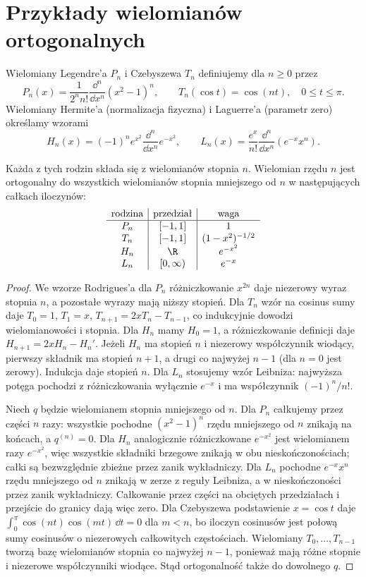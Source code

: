 \section{Przykłady wielomianów ortogonalnych}
\begin{definicja}
\label{ma1:def:orthogonal-polynomials-real}
Wielomiany Legendre'a $P_n$ i Czebyszewa $T_n$
definiujemy dla $n\ge0$ przez
\[
 P_n(x)=\frac1{2^n n!}\frac{\dd^n}{\dd x^n}(x^2-1)^n,
 \qquad T_n(\cos t)=\cos(nt),\quad 0\le t\le\pi.
\]
Wielomiany Hermite'a (normalizacja fizyczna)
i Laguerre'a (parametr zero) określamy wzorami
\[
 H_n(x)=(-1)^ne^{x^2}\frac{\dd^n}{\dd x^n}e^{-x^2},
 \qquad L_n(x)=\frac{e^x}{n!}\frac{\dd^n}{\dd x^n}(e^{-x}x^n).
\]
\end{definicja}
\begin{twierdzenie}
\label{ma1:thm:orthogonal-polynomials-real}
Każda z tych rodzin składa się z wielomianów
stopnia $n$. Wielomian rzędu $n$ jest ortogonalny
do wszystkich wielomianów stopnia mniejszego od $n$
w następujących całkach iloczynów:
\[
 \begin{array}{c|c|c}
 \text{rodzina}&\text{przedział}&\text{waga}\\ \hline
 P_n&[-1,1]&1\\
 T_n&[-1,1]&(1-x^2)^{-1/2}\\
 H_n&\R&e^{-x^2}\\
 L_n&[0,\infty)&e^{-x}
 \end{array}
\]
\end{twierdzenie}
\begin{proof}
We wzorze Rodrigues'a dla $P_n$ różniczkowanie
$x^{2n}$ daje niezerowy wyraz stopnia $n$,
a pozostałe wyrazy mają niższy stopień.
Dla $T_n$ wzór na cosinus sumy daje
$T_0=1$, $T_1=x$, $T_{n+1}=2xT_n-T_{n-1}$,
co indukcyjnie dowodzi wielomianowości i stopnia.
Dla $H_n$ mamy $H_0=1$, a różniczkowanie definicji
daje $H_{n+1}=2xH_n-H_n'$. Jeżeli $H_n$ ma stopień
$n$ i niezerowy współczynnik wiodący, pierwszy
składnik ma stopień $n+1$, a drugi co najwyżej
$n-1$ (dla $n=0$ jest zerowy). Indukcja daje stopień $n$.
Dla $L_n$ stosujemy wzór Leibniza: najwyższa
potęga pochodzi z różniczkowania wyłącznie
$e^{-x}$ i ma współczynnik $(-1)^n/n!$.

Niech $q$ będzie wielomianem stopnia mniejszego od $n$.
Dla $P_n$ całkujemy przez części $n$ razy:
wszystkie pochodne $(x^2-1)^n$ rzędu mniejszego od $n$
znikają na końcach, a $q^{(n)}=0$.
Dla $H_n$ analogicznie różniczkowane $e^{-x^2}$
jest wielomianem razy $e^{-x^2}$, więc wszystkie
składniki brzegowe znikają w obu nieskończonościach;
całki są bezwzględnie zbieżne przez zanik wykładniczy.
Dla $L_n$ pochodne $e^{-x}x^n$ rzędu mniejszego
od $n$ znikają w zerze z reguły Leibniza, a w
nieskończoności przez zanik wykładniczy.
Całkowanie przez części na obciętych przedziałach
i przejście do granicy dają więc zero.
Dla Czebyszewa podstawienie $x=\cos t$ daje
$\int_0^\pi\cos(nt)\cos(mt)\,\dd t=0$ dla $m<n$,
bo iloczyn cosinusów jest połową sumy cosinusów
o niezerowych całkowitych częstościach.
Wielomiany $T_0,\ldots,T_{n-1}$ tworzą bazę
wielomianów stopnia co najwyżej $n-1$, ponieważ
mają różne stopnie i niezerowe współczynniki wiodące.
Stąd ortogonalność także do dowolnego $q$.
\end{proof}
